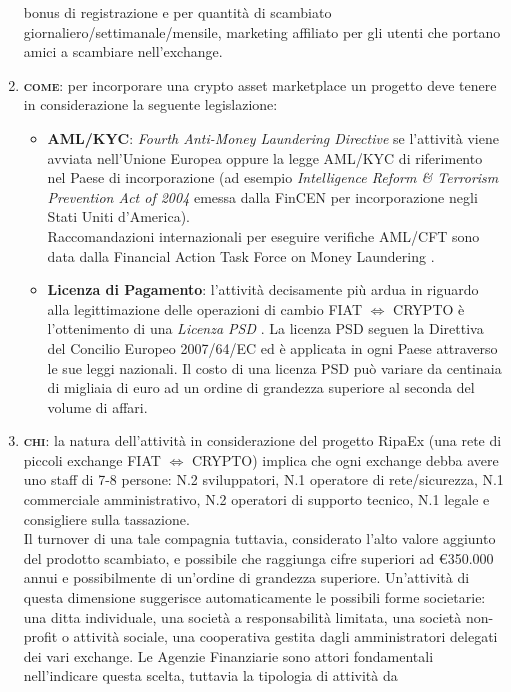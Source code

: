 \begin{enumerate}
	bonus di registrazione e per quantità di scambiato giornaliero/settimanale/mensile, marketing affiliato per gli utenti che portano
	amici a scambiare nell'exchange.
	\item \textbf{\textsc{come}}: per incorporare una crypto asset marketplace un progetto deve tenere in considerazione la seguente legislazione:
		\begin{itemize}
			\item \textbf{AML/KYC}: \textit{Fourth Anti-Money Laundering Directive} se l'attività viene avviata nell'Unione Europea \cite{4AMLD} 
			oppure la legge AML/KYC di riferimento nel Paese di incorporazione (ad esempio \textit{Intelligence Reform \& Terrorism Prevention Act of 2004}
			emessa dalla FinCEN per incorporazione negli Stati Uniti d'America).\\
			Raccomandazioni internazionali per eseguire verifiche AML/CFT sono data dalla Financial Action Task Force on Money Laundering \cite{FATF}.
			\item \textbf{Licenza di Pagamento}: l'attività decisamente più ardua in riguardo alla legittimazione delle operazioni di cambio FIAT $\Leftrightarrow$ CRYPTO
			è l'ottenimento di una \textit{Licenza PSD} \cite{PSD}.
			La licenza PSD seguen la Direttiva del Concilio Europeo 2007/64/EC ed è applicata in ogni Paese attraverso le sue leggi nazionali.
			Il costo di una licenza PSD può variare da centinaia di migliaia di euro ad un ordine di grandezza superiore al seconda del volume di affari.
		\end{itemize}
	\item \textbf{\textsc{chi}}: la natura dell'attività in considerazione del progetto RipaEx 
	(una rete di piccoli exchange FIAT $\Leftrightarrow$ CRYPTO)
	implica che ogni exchange debba avere uno staff di 7-8 persone: N.2 sviluppatori, N.1 operatore di rete/sicurezza, 
	N.1 commerciale amministrativo, N.2 operatori di supporto tecnico, N.1 legale e consigliere sulla tassazione. \\
	Il turnover di una tale compagnia tuttavia, considerato l'alto valore aggiunto del prodotto scambiato, e possibile che raggiunga cifre
	superiori ad \euro 350.000 annui e possibilmente di un'ordine di grandezza superiore. Un'attività di questa dimensione
	suggerisce automaticamente le possibili forme societarie: una ditta individuale, una società a responsabilità limitata,
	una società non-profit o attività sociale, una cooperativa gestita dagli amministratori delegati dei vari exchange.
	Le Agenzie Finanziarie sono attori fondamentali nell'indicare questa scelta, tuttavia la tipologia di attività da

\end{enumerate}
